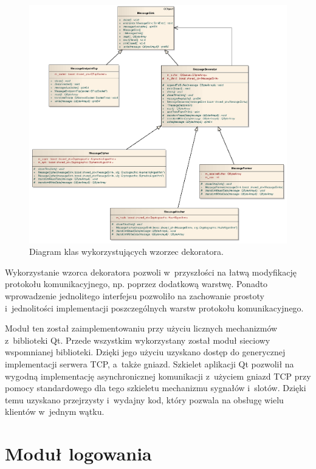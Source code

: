 
\begin{figure}[htpb]
  \centering
  \caption{Diagram klas wykorzystujących wzorzec dekoratora.}
  \label{fig:Dekorator}
\includegraphics[width=1\textwidth]{img/dekorator.png}
\end{figure}

Wykorzystanie wzorca dekoratora pozwoli w~przyszłości na łatwą
modyfikację protokołu komunikacyjnego, np. poprzez dodatkową
warstwę. Ponadto wprowadzenie jednolitego interfejsu pozwoliło na
zachowanie prostoty i~jednolitości implementacji poszczególnych warstw
protokołu komunikacyjnego.

Moduł ten został zaimplementowaniu przy użyciu licznych mechanizmów
z~biblioteki Qt. Przede wszystkim wykorzystany został moduł sieciowy
wspomnianej biblioteki. Dzięki jego użyciu uzyskano dostęp do
generycznej implementacji serwera TCP, a~także gniazd. Szkielet
aplikacji Qt pozwolił na wygodną implementację asynchronicznej
komunikacji z~użyciem gniazd TCP przy pomocy standardowego dla tego
szkieletu mechanizmu sygnałów i~slotów. Dzięki temu uzyskano
przejrzysty i~wydajny kod, który pozwala na obsługę wielu klientów
w~jednym wątku.

\section[Moduł logowania][Moduł logowania]{Moduł logowania}


